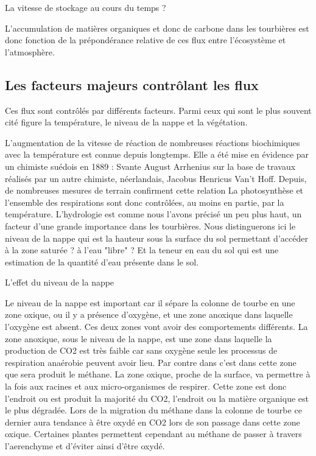 La vitesse de stockage au cours du temps ?

L'accumulation de matières organiques et donc de carbone dans les tourbières est donc fonction de la prépondérance relative de ces flux entre l'écosystème et l'atmosphère.

\subsection{Les facteurs majeurs contrôlant les flux}



Ces flux sont contrôlés par différents facteurs.
Parmi ceux qui sont le plus souvent cité figure la température, le niveau de la nappe et la végétation.

L'augmentation de la vitesse de réaction de nombreuses réactions biochimiques avec la température est connue depuis longtemps.
Elle a été mise en évidence par un chimiste suédois en 1889 : Svante August Arrhenius sur la base de travaux réalisés par un autre chimiste, néerlandais, Jacobus Henricus Van't Hoff.
Depuis, de nombreuses mesures de terrain confirment cette relation \plop
La photosynthèse et l'ensemble des respirations sont donc contrôlées, au moins en partie, par la température.
L'hydrologie est comme nous l'avons précisé un peu plus haut, un facteur d'une grande importance dans les tourbières.
Nous distinguerons ici le niveau de la nappe qui est la hauteur sous la surface du sol permettant d'accéder à la zone saturée ? à l'eau "libre" ?
Et la teneur en eau du sol qui est une estimation de la quantité d'eau présente dans le sol.

L'effet du niveau de la nappe \par
Le niveau de la nappe est important car il sépare la colonne de tourbe en une zone oxique, ou il y a présence d'oxygène, et une zone anoxique dans laquelle l'oxygène est absent.
Ces deux zones vont avoir des comportements différents.
La zone anoxique, sous le niveau de la nappe, est une zone dans laquelle la production de CO2 est très faible car sans oxygène seule les processus de respiration anaérobie peuvent avoir lieu.
Par contre dans c'est dans cette zone que sera produit le méthane.
La zone oxique, proche de la surface, va permettre à la fois aux racines et aux micro-organismes de respirer.
Cette zone est donc l'endroit ou est produit la majorité du CO2, l'endroit ou la matière organique est le plus dégradée.
Lors de la migration du méthane dans la colonne de tourbe ce dernier aura tendance à être oxydé en CO2 lors de son passage dans cette zone oxique.
Certaines plantes permettent cependant au méthane de passer à travers l'aerenchyme et d'éviter ainsi d'être oxydé.

